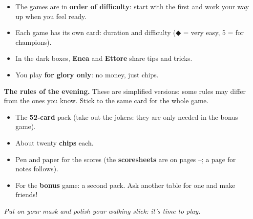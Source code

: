 \documentclass[10pt]{article}
\begin{document}
\begin{itemize}
	\item The games are in \textbf{order of difficulty}: start with the first and work your way up when you feel ready.
	\item Each game has its own card: duration and difficulty ({\suitfont\color{gold}◆} = very easy, 5 = for champions).
	\item In the dark boxes, \textbf{Enea} and \textbf{Ettore} share tips and tricks.
	\item You play \textbf{for glory only}: no money, just chips. 
\end{itemize}
\begin{callout}
	\textbf{The rules of the evening.} These are simplified versions: some rules may differ from the ones you know. Stick to the same card for the whole game. 
\end{callout}

\begin{itemize}
	\item The \textbf{52-card} pack (take out the jokers: they are only needed in the bonus game).
	\item About twenty \textbf{chips} each.
	\item Pen and paper for the scores (the \textbf{scoresheets} are on pages \pageref{segnapunti}–\pageref{segnapunti-6}; a page for notes follows).
	\item For the \textbf{bonus} game: a second pack. Ask another table for one and make friends!
\end{itemize}
\vspace{1mm}
\begin{center}
	\itshape\small\color{golddk}Put on your mask and polish your walking stick: it’s time to play.
\end{center}
\end{document}
